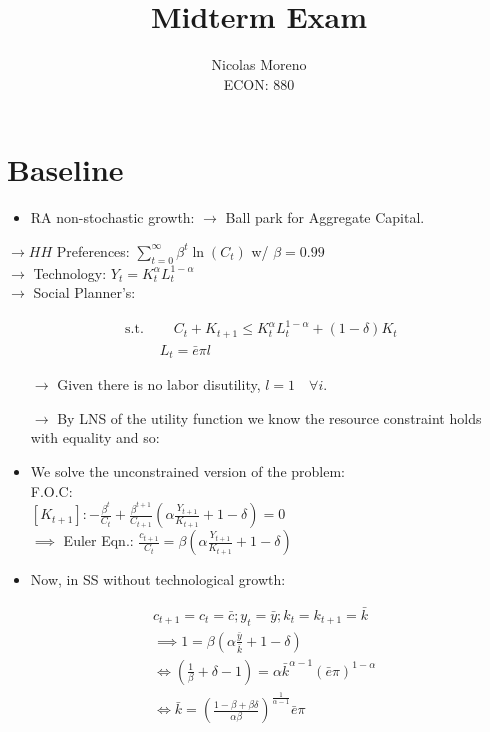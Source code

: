 \documentclass[12pt]{article}
\begin{document}
\title{Midterm Exam}
\author{Nicolas Moreno \\
ECON: 880}
\maketitle

\section{Baseline}

\begin{itemize}
    \item RA non-stochastic growth: $\rightarrow$ Ball park for Aggregate Capital.
\end{itemize}
$\rightarrow H H$ Preferences: $\sum_{t=0}^{\infty} \beta^{t} \ln \left(C_{t}\right)$ w/ $\beta=0.99$\\
$\rightarrow$ Technology: $Y_{t}=K_{t}^{\alpha} L_{t}^{1-\alpha}$\\
$\rightarrow$ Social Planner's:

$$
\begin{aligned}
\text { s.t. } &  \quad C_{t}+K_{t+1} \leq K_{t}^{\alpha} L_{t}^{1-\alpha} + (1-\delta) K_{t} \\
& L_{t}=\bar{e} \pi l
\end{aligned}
$$
\begin{itemize}
\item[$\rightarrow$] Given there is no labor disutility, $l=1 \quad \forall i$. 
\item[$\rightarrow$] By LNS of the utility function we know the resource constraint holds with equality and so:
\end{itemize}

\begin{itemize}
  \item We solve the unconstrained version of the problem: 
  \\
  F.O.C:
  \\
  $\left[K_{t+1}\right]:-\frac{\beta^{t}}{C_{t}}+\frac{\beta^{t+1}}{C_{t+1}}\left(\alpha \frac{Y_{t+1}}{K_{t+1}}+ 1-\delta\right)=0$\\
$\implies$ Euler Eqn.: $\frac{c_{t+1}}{C_{t}}=\beta\left(\alpha \frac{Y_{t+1}}{K_{t+1}} + 1-\delta\right)$
  \item Now, in SS without technological growth:
\end{itemize}

$$
\begin{aligned}
& c_{t+1}=c_{t}=\bar{c} ; y_{t}=\bar{y} ; k_{t}=k_{t+1}=\bar{k} \\
& \implies 1=\beta\left(\alpha \frac{\bar{y}}{\bar{k}}+1-\delta\right) \\
& \Leftrightarrow\left(\frac{1}{\beta}+\delta - 1\right)=\alpha \bar{k}^{\alpha-1}(\bar{e} \pi)^{1-\alpha} \\
& \Leftrightarrow \bar{k}=\left(\frac{1-\beta+\beta \delta}{\alpha \beta}\right)^{\frac{1}{\alpha-1}} \bar{e} \pi
\end{aligned}
$$
\end{document}
